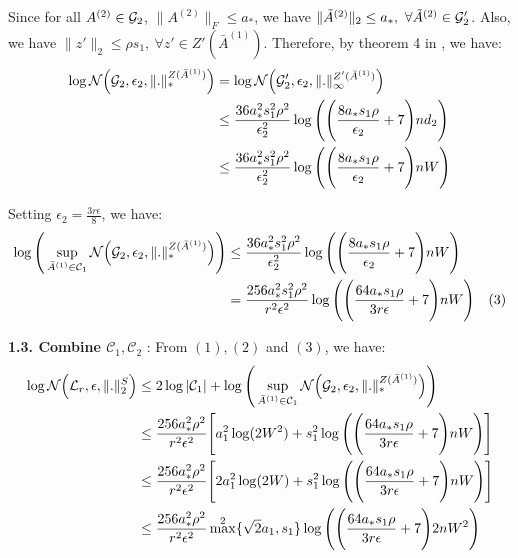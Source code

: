 \noindent Since for all $A^{(2)}\in \mathcal{G}_2$, $\|A^{(2)}\|_F\le a_*$, we have $\|\tilde A^{(2)}\|_2\le a_*, \ \forall \tilde A^{(2)} \in \G_2'$. Also, we have $\|z'\|_2\le \rho s_1, \ \forall z'\in Z'(\bar A^{(1)})$. Therefore, by theorem 4 in \cite{article:tong_zhang}, we have:
\begin{align*}
    \log\mathcal{N}\Big( \mathcal{G}_2, \epsilon_2, \|.\|_*^{Z(\bar A^{(1)})} \Big) &= \log\mathcal{N}\Big( \mathcal{G}_2', \epsilon_2, \|.\|_\infty^{Z'(\bar A^{(1)})} \Big) \\
        &\le \frac{36a_*^2s_1^2\rho^2}{\epsilon_2^2} \log\Bigg( 
            \Bigg( 
                \frac{8a_*s_1\rho}{\epsilon_2} + 7
             \Bigg)nd_2
         \Bigg) \\
        &\le \frac{36a_*^2s_1^2\rho^2}{\epsilon_2^2} \log\Bigg( 
            \Bigg( 
                \frac{8a_*s_1\rho}{\epsilon_2} + 7
             \Bigg)nW
         \Bigg)
\end{align*}
        
\noindent Setting $\epsilon_2 = \frac{3r\epsilon}{8}$, we have:
\begin{align*}
    \log\Bigg( 
        \sup_{\bar A^{(1)} \in \mathcal{C}_1} \mathcal{N}\Big( \mathcal{G}_2, \epsilon_2, \|.\|_*^{Z(\bar A^{(1)})} \Big)
     \Bigg) &\le \frac{36a_*^2s_1^2\rho^2}{\epsilon_2^2} \log\Bigg( 
        \Bigg( 
            \frac{8a_*s_1\rho}{\epsilon_2} + 7
         \Bigg)nW
     \Bigg) \\
    &= \frac{256a_*^2s_1^2\rho^2}{r^2\epsilon^2} \log\Bigg( 
        \Bigg( 
            \frac{64a_*s_1\rho}{3r\epsilon} + 7
         \Bigg)nW
     \Bigg) \ \ \ (3)
\end{align*}

\noindent\newline\textbf{1.3. Combine $\mathcal{C}_1, \mathcal{C}_2$} : From $(1), (2)$ and $(3)$, we have:
\begin{align*}
    \log\mathcal{N}\Big( \mathcal{L}_r, \epsilon, \|.\|_2^S \Big) &\le 2\log|\mathcal{C}_1| + \log\Bigg( 
        \sup_{\bar A^{(1)} \in \mathcal{C}_1} \mathcal{N}\Big( \mathcal{G}_2, \epsilon_2, \|.\|_*^{Z(\bar A^{(1)})} \Big)
     \Bigg) \\
    &\le \frac{256a_*^2\rho^2}{r^2\epsilon^2}\Bigg[ 
        a_1^2\log(2W^2) + s_1^2\log\Bigg( \Bigg( 
            \frac{64a_*s_1\rho}{3r\epsilon} + 7
         \Bigg)nW \Bigg)
     \Bigg] \\
    &\le \frac{256a_*^2\rho^2}{r^2\epsilon^2}\Bigg[ 
        2a_1^2\log(2W) + s_1^2\log\Bigg( \Bigg( 
            \frac{64a_*s_1\rho}{3r\epsilon} + 7
         \Bigg)nW \Bigg)
     \Bigg] \\
    &\le \frac{256a_*^2\rho^2}{r^2\epsilon^2}\max^2\{\sqrt{2}a_1, s_1\} \log\Bigg( 
        \Bigg( 
            \frac{64a_*s_1\rho}{3r\epsilon} + 7
         \Bigg)2nW^2
     \Bigg)
\end{align*}



